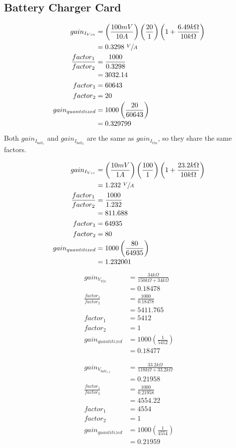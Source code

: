 \documentclass[11pt]{article} %
\begin{document}
\subsection{Battery Charger Card}

\begin{align*}
gain_{I_{Vin}} &= \left(\frac{100mV}{10A}\right) \left(\frac{20}{1}\right) \left(1 + \frac{6.49k\Omega}{10k\Omega}\right) \\
&= 0.3298~\sfrac{V}{A} \\
\frac{factor_1}{factor_2} &= \frac{1000}{0.3298} \\
&= 3032.14
\\
factor_1 &= 60643 \\
factor_2 &= 20 \\
gain_{quantitized} &= 1000 \left(\frac{20}{60643}\right) \\
&= 0.329799
\end{align*}

Both \(gain_{I_{batt_1}}\) and \(gain_{I_{batt_2}}\) are the same as \(gain_{I_{Vin}}\), so they share the same factors.

\begin{align*}
gain_{I_{Vcc}} &= \left(\frac{10mV}{1A}\right) \left(\frac{100}{1}\right) \left(1 + \frac{23.2k\Omega}{10k\Omega}\right) \\
&= 1.232~\sfrac{V}{A} \\
\frac{factor_1}{factor_2} &= \frac{1000}{1.232} \\
&= 811.688
\\
factor_1 &= 64935 \\
factor_2 &= 80 \\
gain_{quantitized} &= 1000 \left(\frac{80}{64935}\right) \\
&= 1.232001
\end{align*}

\begin{align*}
gain_{V_{Vin}} &= \frac{34k\Omega}{150k\Omega + 34k\Omega} \\
&= 0.18478 \\
\frac{factor_1}{factor_2} &= \frac{1000}{0.18478} \\
&= 5411.765
\\
factor_1 &= 5412 \\
factor_2 &= 1 \\
gain_{quantitized} &= 1000 \left(\frac{1}{5412}\right) \\
&= 0.18477
\end{align*}

\begin{align*}
gain_{V_{batt_{1,2}}} &= \frac{33.2k\Omega}{118k\Omega + 33.2k\Omega} \\
&= 0.21958 \\
\frac{factor_1}{factor_2} &= \frac{1000}{0.21958} \\
&= 4554.22
\\
factor_1 &= 4554 \\
factor_2 &= 1 \\
gain_{quantitized} &= 1000 \left(\frac{1}{4554}\right) \\
&= 0.21959
\end{align*}
\end{document}
